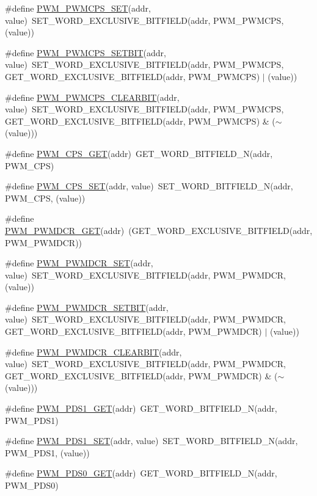 \begin{DoxyCompactItemize}
\item 
\#define \hyperlink{a00564_a45cf8dce025850209b19d0a27f54dcf9}{PWM\_\-PWMCPS\_\-SET}(addr, value)~SET\_\-WORD\_\-EXCLUSIVE\_\-BITFIELD(addr, PWM\_\-PWMCPS, (value))
\item 
\#define \hyperlink{a00564_a0e5cccf621db80dd75372e2ec3f3ed32}{PWM\_\-PWMCPS\_\-SETBIT}(addr, value)~SET\_\-WORD\_\-EXCLUSIVE\_\-BITFIELD(addr, PWM\_\-PWMCPS, GET\_\-WORD\_\-EXCLUSIVE\_\-BITFIELD(addr, PWM\_\-PWMCPS) $|$ (value))
\item 
\#define \hyperlink{a00564_afd02755319269c5044ba59d94bd16753}{PWM\_\-PWMCPS\_\-CLEARBIT}(addr, value)~SET\_\-WORD\_\-EXCLUSIVE\_\-BITFIELD(addr, PWM\_\-PWMCPS, GET\_\-WORD\_\-EXCLUSIVE\_\-BITFIELD(addr, PWM\_\-PWMCPS) \& ($\sim$(value)))
\item 
\#define \hyperlink{a00564_a837568afee3176a95e570fc3b3e80b4a}{PWM\_\-CPS\_\-GET}(addr)~GET\_\-WORD\_\-BITFIELD\_\-N(addr, PWM\_\-CPS)
\item 
\#define \hyperlink{a00564_abc827d21f392fe1b73e614af119d2260}{PWM\_\-CPS\_\-SET}(addr, value)~SET\_\-WORD\_\-BITFIELD\_\-N(addr, PWM\_\-CPS, (value))
\item 
\#define \hyperlink{a00564_a9848f48672e2d97f964a8e861204f3a6}{PWM\_\-PWMDCR\_\-GET}(addr)~(GET\_\-WORD\_\-EXCLUSIVE\_\-BITFIELD(addr, PWM\_\-PWMDCR))
\item 
\#define \hyperlink{a00564_a525343af70a11ea863801e070724aa57}{PWM\_\-PWMDCR\_\-SET}(addr, value)~SET\_\-WORD\_\-EXCLUSIVE\_\-BITFIELD(addr, PWM\_\-PWMDCR, (value))
\item 
\#define \hyperlink{a00564_ad1b66d41c08d17b9687a2e640d4d2410}{PWM\_\-PWMDCR\_\-SETBIT}(addr, value)~SET\_\-WORD\_\-EXCLUSIVE\_\-BITFIELD(addr, PWM\_\-PWMDCR, GET\_\-WORD\_\-EXCLUSIVE\_\-BITFIELD(addr, PWM\_\-PWMDCR) $|$ (value))
\item 
\#define \hyperlink{a00564_a8cfa0f8d5fc6e6443de1e9d8b6f6f38b}{PWM\_\-PWMDCR\_\-CLEARBIT}(addr, value)~SET\_\-WORD\_\-EXCLUSIVE\_\-BITFIELD(addr, PWM\_\-PWMDCR, GET\_\-WORD\_\-EXCLUSIVE\_\-BITFIELD(addr, PWM\_\-PWMDCR) \& ($\sim$(value)))
\item 
\#define \hyperlink{a00564_aed2a3963a64ac1bdafd860e341d2b337}{PWM\_\-PDS1\_\-GET}(addr)~GET\_\-WORD\_\-BITFIELD\_\-N(addr, PWM\_\-PDS1)
\item 
\#define \hyperlink{a00564_a3846da2403b76b1f6861c354f88c2328}{PWM\_\-PDS1\_\-SET}(addr, value)~SET\_\-WORD\_\-BITFIELD\_\-N(addr, PWM\_\-PDS1, (value))
\item 
\#define \hyperlink{a00564_a654457a9292548c1fa4c346541e347b1}{PWM\_\-PDS0\_\-GET}(addr)~GET\_\-WORD\_\-BITFIELD\_\-N(addr, PWM\_\-PDS0)

\end{DoxyCompactItemize}
